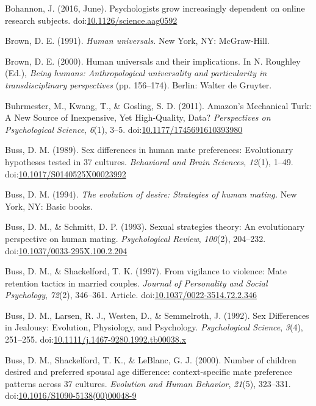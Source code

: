 \documentclass[english,man]{apa6}
\theoremstyle{definition}
\theoremstyle{definition}
\theoremstyle{remark}
\begin{document}
\hypertarget{ref-Bohannon2016}{}
Bohannon, J. (2016, June). Psychologists grow increasingly dependent on
online research subjects.
doi:\href{https://doi.org/10.1126/science.aag0592}{10.1126/science.aag0592}

\hypertarget{ref-Brown1991}{}
Brown, D. E. (1991). \emph{Human universals}. New York, NY: McGraw-Hill.

\hypertarget{ref-Brown2000}{}
Brown, D. E. (2000). Human universals and their implications. In N.
Roughley (Ed.), \emph{Being humans: Anthropological universality and
particularity in transdisciplinary perspectives} (pp. 156--174). Berlin:
Walter de Gruyter.

\hypertarget{ref-Buhrmester2011}{}
Buhrmester, M., Kwang, T., \& Gosling, S. D. (2011). Amazon's Mechanical
Turk: A New Source of Inexpensive, Yet High-Quality, Data?
\emph{Perspectives on Psychological Science}, \emph{6}(1), 3--5.
doi:\href{https://doi.org/10.1177/1745691610393980}{10.1177/1745691610393980}

\hypertarget{ref-Buss1989}{}
Buss, D. M. (1989). Sex differences in human mate preferences:
Evolutionary hypotheses tested in 37 cultures. \emph{Behavioral and
Brain Sciences}, \emph{12}(1), 1--49.
doi:\href{https://doi.org/10.1017/S0140525X00023992}{10.1017/S0140525X00023992}

\hypertarget{ref-Buss1994}{}
Buss, D. M. (1994). \emph{The evolution of desire: Strategies of human
mating.} New York, NY: Basic books.

\hypertarget{ref-Buss1993}{}
Buss, D. M., \& Schmitt, D. P. (1993). Sexual strategies theory: An
evolutionary perspective on human mating. \emph{Psychological Review},
\emph{100}(2), 204--232.
doi:\href{https://doi.org/10.1037/0033-295X.100.2.204}{10.1037/0033-295X.100.2.204}

\hypertarget{ref-Buss1997}{}
Buss, D. M., \& Shackelford, T. K. (1997). From vigilance to violence:
Mate retention tactics in married couples. \emph{Journal of Personality
and Social Psychology}, \emph{72}(2), 346--361. Article.
doi:\href{https://doi.org/10.1037/0022-3514.72.2.346}{10.1037/0022-3514.72.2.346}

\hypertarget{ref-Buss1992}{}
Buss, D. M., Larsen, R. J., Westen, D., \& Semmelroth, J. (1992). Sex
Differences in Jealousy: Evolution, Physiology, and Psychology.
\emph{Psychological Science}, \emph{3}(4), 251--255.
doi:\href{https://doi.org/10.1111/j.1467-9280.1992.tb00038.x}{10.1111/j.1467-9280.1992.tb00038.x}

\hypertarget{ref-Buss2000}{}
Buss, D. M., Shackelford, T. K., \& LeBlanc, G. J. (2000). Number of
children desired and preferred spousal age difference: context-specific
mate preference patterns across 37 cultures. \emph{Evolution and Human
Behavior}, \emph{21}(5), 323--331.
doi:\href{https://doi.org/10.1016/S1090-5138(00)00048-9}{10.1016/S1090-5138(00)00048-9}
\end{document}
